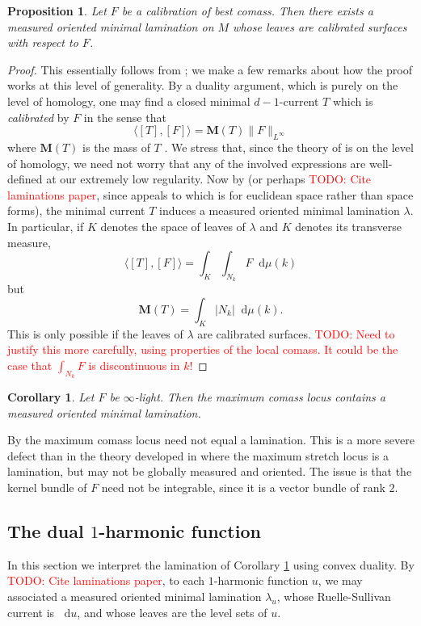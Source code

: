\documentclass[reqno,11pt]{amsart}
\newcommand*\dif{\mathop{}\!\mathrm{d}}
\newcommand{\dfn}[1]{\emph{#1}\index{#1}}
\newtheorem{proposition}[theorem]{Proposition}
\newtheorem{corollary}[theorem]{Corollary}
\theoremstyle{definition}
\numberwithin{equation}{section}
\newcommand\todo[1]{\textcolor{red}{TODO: #1}}
\begin{document}
\begin{proposition}\label{Bangert Cui}
Let $F$ be a calibration of best comass.
Then there exists a measured oriented minimal lamination on $M$ whose leaves are calibrated surfaces with respect to $F$.
\end{proposition}
\begin{proof}
This essentially follows from \cite[Theorem 5.1]{bangert_cui_2017}; we make a few remarks about how the proof works at this level of generality.
By a duality argument, which is purely on the level of homology, one may find a closed minimal $d-1$-current $T$ which is \dfn{calibrated} by $F$ in the sense that
$$\langle [T], [F]\rangle = \mathbf M(T) \|F\|_{L^\infty}$$
where $\mathbf M(T)$ is the mass of $T$ \cite[Proposition 2.2]{bangert_cui_2017}.
We stress that, since the theory of \cite[\S2C]{bangert_cui_2017} is on the level of homology, we need not worry that any of the involved expressions are well-defined at our extremely low regularity.
Now by \cite[Theorem 1]{AUER20011095} (or perhaps \todo{Cite laminations paper}, since \cite{AUER20011095} appeals to \cite[\S37]{Simon84} which is for euclidean space rather than space forms), the minimal current $T$ induces a measured oriented minimal lamination $\lambda$.
In particular, if $K$ denotes the space of leaves of $\lambda$ and $K$ denotes its transverse measure,
$$\langle [T], [F]\rangle = \int_K \int_{N_k} F \dif \mu(k)$$
but 
$$\mathbf M(T) = \int_K |N_k| \dif \mu(k).$$
This is only possible if the leaves of $\lambda$ are calibrated surfaces.
\todo{Need to justify this more carefully, using properties of the local comass. It could be the case that $\int_{N_k} F$ is discontinuous in $k$!}
\end{proof}

\begin{corollary}\label{best comass lamination}
Let $F$ be $\infty$-light.
Then the maximum comass locus contains a measured oriented minimal lamination.
\end{corollary}

By \cite[Example 5.4]{bangert_cui_2017} the maximum comass locus need not equal a lamination.
This is a more severe defect than in the theory developed in \cite{Thurston98,daskalopoulos2020transverse} where the maximum stretch locus is a lamination, but may not be globally measured and oriented.
The issue is that the kernel bundle of $F$ need not be integrable, since it is a vector bundle of rank $2$.

\subsection{The dual \texorpdfstring{$1$-harmonic}{1-harmonic} function}
In this section we interpret the lamination of Corollary \ref{best comass lamination} using convex duality.
By \todo{Cite laminations paper}, to each $1$-harmonic function $u$, we may associated a measured oriented minimal lamination $\lambda_u$, whose Ruelle-Sullivan current is $\dif u$, and whose leaves are the level sets of $u$.
\end{document}
